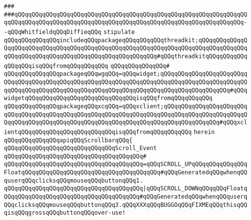 \verb|###|\newline
\verb|###qQQqqQQqqQQqqQQqqQQqqQQqqQQqqQQqqQQqqQQqqQQqqQQqqQQqqQQqqQQqqQQqqQQqqQQqqQQqqQQqqQQqqQQqqQQqqQQqqQQqqQQqqQQqqQQqqQQqqQQqqQQqqQQqqQQqqQQq--qQQqWhitfieldqQQqDiffieqQQq|\newline
\newline
\newline
\verb|stipulate|\newline
\verb|qQQqqQQqqQQqqQQqincludeqQQqpackageqQQqqQQqqQQqthreadkit;qQQqqQQqqQQqqQQqqQQqqQQqqQQqqQQqqQQqqQQqqQQqqQQqqQQqqQQqqQQqqQQqqQQqqQQqqQQqqQQqqQQqqQQqqQQqqQQqqQQqqQQqqQQqqQQqqQQqqQQqqQQqqQQq#qQQqthreadkitqQQqqQQqqQQqqQQqqQQqisqQQqfromqQQqqQQqqQQq|\newline
\verb|qQQqqQQqqQQqqQQq#|\newline
\verb|qQQqqQQqqQQqqQQqpackageqQQqwgqQQq=qQQqwidget;qQQqqQQqqQQqqQQqqQQqqQQqqQQqqQQqqQQqqQQqqQQqqQQqqQQqqQQqqQQqqQQqqQQqqQQqqQQqqQQqqQQqqQQqqQQqqQQqqQQqqQQqqQQqqQQqqQQqqQQqqQQqqQQqqQQqqQQqqQQqqQQqqQQqqQQqqQQqqQQq#qQQqwidgetqQQqqQQqqQQqqQQqqQQqqQQqqQQqqQQqisqQQqfromqQQqqQQqqQQq|\newline
\verb|qQQqqQQqqQQqqQQqpackageqQQqxcqQQq=qQQqxclient;qQQqqQQqqQQqqQQqqQQqqQQqqQQqqQQqqQQqqQQqqQQqqQQqqQQqqQQqqQQqqQQqqQQqqQQqqQQqqQQqqQQqqQQqqQQqqQQqqQQqqQQqqQQqqQQqqQQqqQQqqQQqqQQqqQQqqQQqqQQqqQQqqQQqqQQqqQQq#qQQqxclientqQQqqQQqqQQqqQQqqQQqqQQqqQQqisqQQqfromqQQqqQQqqQQq|\newline
\verb|herein|\newline
\newline
\verb|qQQqqQQqqQQqqQQqapiqQQqScrollbarqQQq{|\newline
\newline
\verb|qQQqqQQqqQQqqQQqqQQqqQQqqQQqqQQqScroll_Event|\newline
\verb|qQQqqQQqqQQqqQQqqQQqqQQqqQQqqQQqqQQqqQQq#|\newline
\verb|qQQqqQQqqQQqqQQqqQQqqQQqqQQqqQQqqQQqqQQq=qQQqSCROLL_UPqQQqqQQqqQQqqQQqFloatqQQqqQQqqQQqqQQqqQQqqQQqqQQqqQQqqQQqqQQq#qQQqGeneratedqQQqwhenqQQquserqQQqclicksqQQqmouseqQQqbuttonqQQq1.|\newline
\verb|qQQqqQQqqQQqqQQqqQQqqQQqqQQqqQQqqQQqqQQq|\verb#|qQQqSCROLL_DOWNqQQqqQQqFloatqQQqqQQqqQQqqQQqqQQqqQQqqQQqqQQqqQQqqQQq#\verb|#qQQqGeneratedqQQqwhenqQQquserqQQqclicksqQQqmouseqQQqbuttonqQQq3.qQQqXXXqQQqBUGGOqQQqFIXMEqQQqthisqQQqisqQQqgrossqQQqbuttonqQQqover-use!|\newline

